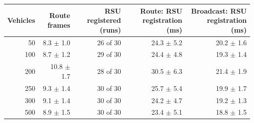 \footnotesize
\renewcommand{\arraystretch}{1.2}
\begin{tabular}{rrrrr}
\toprule
Vehicles & Route frames & RSU registered (runs) & Route: RSU registration (ms) & Broadcast: RSU registration (ms) \\
\midrule
50 & 8.3 $\pm$ 1.0 & 26 of 30 & 24.3 $\pm$ 5.2 & 20.2 $\pm$ 1.6 \\
100 & 8.7 $\pm$ 1.2 & 29 of 30 & 24.4 $\pm$ 4.8 & 19.3 $\pm$ 1.4 \\
200 & 10.8 $\pm$ 1.7 & 28 of 30 & 30.5 $\pm$ 6.3 & 21.4 $\pm$ 1.9 \\
250 & 9.3 $\pm$ 1.4 & 30 of 30 & 25.7 $\pm$ 5.4 & 19.9 $\pm$ 1.7 \\
300 & 9.1 $\pm$ 1.4 & 30 of 30 & 24.2 $\pm$ 4.7 & 19.2 $\pm$ 1.3 \\
500 & 8.9 $\pm$ 1.5 & 30 of 30 & 23.4 $\pm$ 5.1 & 18.8 $\pm$ 1.5 \\
\bottomrule
\end{tabular}
